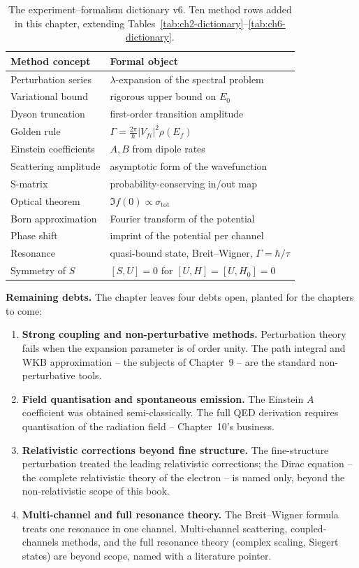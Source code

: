 \begin{table}[htbp]
\centering
\caption{The experiment--formalism dictionary v6. Ten method rows added in this chapter, extending Tables~\ref{tab:ch2-dictionary}--\ref{tab:ch6-dictionary}.}
\label{tab:ch8-dictionary}
\begin{tabular}{@{}ll@{}}
\toprule
Method concept & Formal object \\
\midrule
Perturbation series & $\lambda$-expansion of the spectral problem \\
Variational bound & rigorous upper bound on $E_{0}$ \\
Dyson truncation & first-order transition amplitude \\
Golden rule & $\Gamma = \frac{2\pi}{\hbar}|V_{fi}|^{2}\rho(E_{f})$ \\
Einstein coefficients & $A,B$ from dipole rates \\
Scattering amplitude & asymptotic form of the wavefunction \\
S-matrix & probability-conserving in/out map \\
Optical theorem & $\Im f(0) \propto \sigma_{\text{tot}}$ \\
Born approximation & Fourier transform of the potential \\
Phase shift & imprint of the potential per channel \\
Resonance & quasi-bound state, Breit--Wigner, $\Gamma = \hbar/\tau$ \\
Symmetry of $S$ & $[S,U]=0$ for $[U,H]=[U,H_{0}]=0$ \\
\bottomrule
\end{tabular}
\end{table}

\medskip\noindent\textbf{Remaining debts.}
The chapter leaves four debts open, planted for the chapters to come:
\begin{enumerate}
\item \textbf{Strong coupling and non-perturbative methods.} Perturbation theory fails when the expansion parameter is of order unity. The path integral and WKB approximation -- the subjects of Chapter~9 -- are the standard non-perturbative tools.
\item \textbf{Field quantisation and spontaneous emission.} The Einstein $A$ coefficient was obtained semi-classically. The full QED derivation requires quantisation of the radiation field -- Chapter~10's business.
\item \textbf{Relativistic corrections beyond fine structure.} The fine-structure perturbation treated the leading relativistic corrections; the Dirac equation -- the complete relativistic theory of the electron -- is named only, beyond the non-relativistic scope of this book.
\item \textbf{Multi-channel and full resonance theory.} The Breit--Wigner formula treats one resonance in one channel. Multi-channel scattering, coupled-channels methods, and the full resonance theory (complex scaling, Siegert states) are beyond scope, named with a literature pointer.
\end{enumerate}

